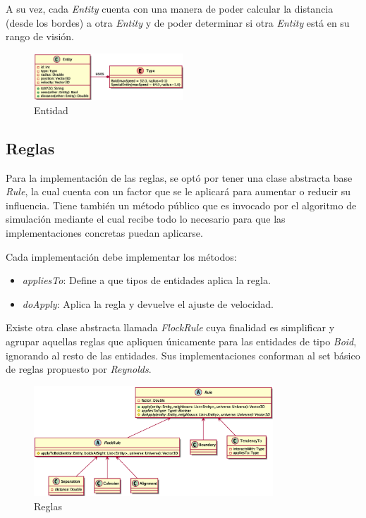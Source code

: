 \documentclass[a4paper]{article}
\begin{document}
            A su vez, cada \textit{Entity} cuenta con una manera de poder calcular la distancia (desde los bordes) a otra \textit{Entity} y de poder determinar si otra \textit{Entity} está en su rango de visión.

            \begin{figure}[H]
                \centering
                \includegraphics[width=0.5\textwidth]{../imgs/entity}
                \caption{Entidad}
                \label{fig:entity_implementation}
            \end{figure}

        \subsection{Reglas}
            Para la implementación de las reglas, se optó por tener una clase abstracta base \textit{Rule}, la cual cuenta con un factor que se le aplicará para aumentar o reducir su influencia. Tiene también un método público que es invocado por el algoritmo de simulación mediante el cual recibe todo lo necesario para que las implementaciones concretas puedan aplicarse.

            Cada implementación debe implementar los métodos:
            \begin{itemize}
                \item \textit{appliesTo}: Define a que tipos de entidades aplica la regla.
                \item \textit{doApply}: Aplica la regla y devuelve el ajuste de velocidad.
            \end{itemize}

            Existe otra clase abstracta llamada \textit{FlockRule} cuya finalidad es simplificar y agrupar aquellas reglas que apliquen únicamente para las entidades de tipo \textit{Boid}, ignorando al resto de las entidades. Sus implementaciones conforman al set básico de reglas propuesto por \textit{Reynolds}.
            \begin{figure}[H]
                \centering
                \includegraphics[width=0.8\textwidth]{../imgs/rules}
                \caption{Reglas}
                \label{fig:rules_implementation}
            \end{figure}
\end{document}
